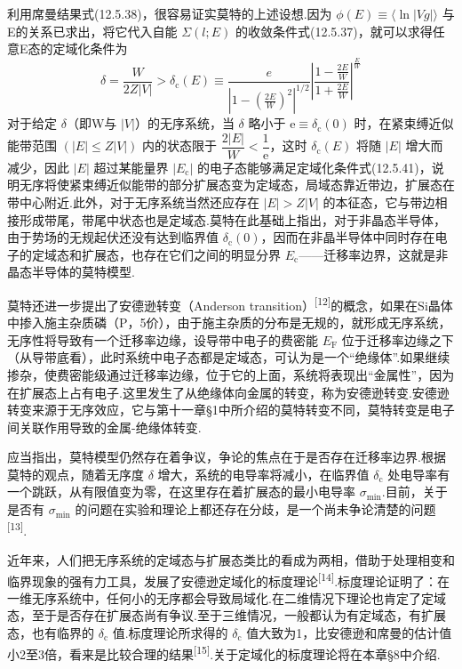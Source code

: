利用席曼结果式(12.5.38)，很容易证实莫特的上述设想.因为 $\phi\left(E\right)\equiv\langle\ln|Vg|\rangle$ 与E的关系已求出，将它代入自能 $\Sigma\left(l;E\right)$ 的收敛条件式(12.5.37)，就可以求得任意E态的定域化条件为
\begin{equation}
  \delta=\frac{W}{2Z|V|}>\delta_{\mathrm{c}}\left(E\right)
  \equiv\frac{e}{\left|1-\left(\frac{2E}{W}\right)^{2}\right|^{1/2}}
  \left|\frac{1-\frac{2E}{W}}{1+\frac{2E}{W}}\right|^{\frac{E}{W}}
\end{equation}
对于给定 $\delta$（即W与 $|V|$）的无序系统，当 $\delta$ 略小于 $\mathrm{e}\equiv\delta_{\mathrm{c}}\left(0\right)$ 时，在紧束缚近似能带范围 $\left(|E|\leqslant Z|V|\right)$ 内的状态限于 $\dfrac{2|E|}{W}<\dfrac{1}{\mathrm{e}}$，这时 $\delta_{\mathrm{c}}\left(E\right)$ 将随 $|E|$ 增大而减少，因此 $|E|$ 超过某能量界 $|E_{\mathrm{c}}|$ 的电子态能够满足定域化条件式(12.5.41)，说明无序将使紧束缚近似能带的部分扩展态变为定域态，局域态靠近带边，扩展态在带中心附近.此外，对于无序系统当然还应存在 $|E|>Z|V|$ 的本征态，它与带边相接形成带尾，带尾中状态也是定域态.莫特在此基础上指出，对于非晶态半导体，由于势场的无规起伏还没有达到临界值 $\delta_{\mathrm{c}}\left(0\right)$，因而在非晶半导体中同时存在电子的定域态和扩展态，也存在它们之间的明显分界 $E_{\mathrm{c}}$——迁移率边界，这就是非晶态半导体的莫特模型.

莫特还进一步提出了安德逊转变（Anderson transition）\textsuperscript{[12]}的概念，如果在Si晶体中掺入施主杂质磷（P，5价），由于施主杂质的分布是无规的，就形成无序系统，无序性将导致有一个迁移率边缘，设导带中电子的费密能 $E_{\mathrm{F}}$ 位于迁移率边缘之下（从导带底看），此时系统中电子态都是定域态，可认为是一个“绝缘体”.如果继续掺杂，使费密能级通过迁移率边缘，位于它的上面，系统将表现出“金属性”，因为在扩展态上占有电子.这里发生了从绝缘体向金属的转变，称为安德逊转变.安德逊转变来源于无序效应，它与第十一章§1中所介绍的莫特转变不同，莫特转变是电子间关联作用导致的金属-绝缘体转变.

应当指出，莫特模型仍然存在着争议，争论的焦点在于是否存在迁移率边界.根据莫特的观点，随着无序度 $\delta$ 增大，系统的电导率将减小，在临界值 $\delta_{\mathrm{c}}$ 处电导率有一个跳跃，从有限值变为零，在这里存在着扩展态的最小电导率 $\sigma_{\mathrm{min}}$.目前，关于是否有 $\sigma_{\mathrm{min}}$ 的问题在实验和理论上都还存在分歧，是一个尚未争论清楚的问题\textsuperscript{[13]}.

近年来，人们把无序系统的定域态与扩展态类比的看成为两相，借助于处理相变和临界现象的强有力工具，发展了安德逊定域化的标度理论\textsuperscript{[14]}.标度理论证明了：在一维无序系统中，任何小的无序都会导致局域化.在二维情况下理论也肯定了定域态，至于是否存在扩展态尚有争议.至于三维情况，一般都认为有定域态，有扩展态，也有临界的 $\delta_{\mathrm{c}}$ 值.标度理论所求得的 $\delta_{\mathrm{c}}$ 值大致为1，比安德逊和席曼的估计值小2至3倍，看来是比较合理的结果\textsuperscript{[15]}.关于定域化的标度理论将在本章§8中介绍.

